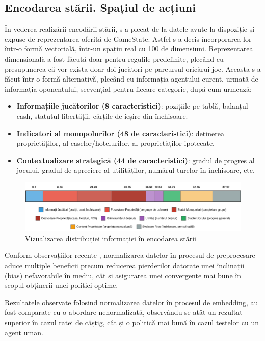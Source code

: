 \subsection{Encodarea stării. Spațiul de acțiuni}\label{state-embeding}
În vederea realizării encodării stării, s-a plecat de la datele avute la dispoziție și expuse de reprezentarea oferită de GameState. Astfel s-a decis încorporarea lor într-o formă vectorială, într-un spațiu real cu 100 de dimensiuni. Reprezentarea dimensională a fost făcută doar pentru regulile predefinite, plecând cu presupunerea că vor exista doar doi jucători pe parcursul oricărui joc. Aceasta s-a făcut într-o formă alternativă, plecând cu informația agentului curent, urmată de informația oponentului, secvențial pentru fiecare categorie, după cum urmează:
\begin{itemize}
    \item \textbf{Informațiile jucătorilor (8 caracteristici)}: pozițiile pe tablă, balanțul cash, statutul libertății, cărțile de ieșire din închisoare.
    \item \textbf{Indicatori al monopolurilor (48 de caracteristici)}: deținerea proprietăților, al caselor/hotelurilor, al proprietăților ipotecate.
    \item \textbf{Contextualizare strategică (44 de caracteristici)}: gradul de progres al jocului, gradul de apreciere al utilităților, numărul turelor în închisoare, etc.
\end{itemize}

\begin{figure}[H]
    \centering
    \includegraphics[width=16cm]{images/vector_visualizer.png}
    \caption{Vizualizarea distribuției informației în encodarea stării}
    \label{fig:state-distribution}
\end{figure}

Conform observațiilor recente \cite{drl_normalization_benefits}, normalizarea datelor în procesul de preprocesare aduce multiple beneficii precum reducerea pierderilor datorate unei înclinații (bias) nefavorabile în mediu, cât și asigurarea unei convergențe mai bune în scopul obținerii unei politici optime.

Rezultatele observate folosind normalizarea datelor în procesul de embedding, au fost comparate cu o abordare nenormalizată, observându-se atât un rezultat superior în cazul ratei de câștig, cât și o politică mai bună în cazul testelor cu un agent uman.

